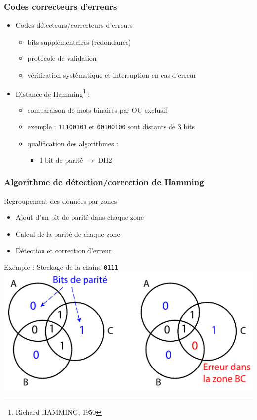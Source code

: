 \begin{frame}
\frametitle{Codes correcteurs d'erreurs}
\begin{itemize}
\item <1> Codes détecteurs/correcteurs d'erreurs
\begin{itemize}
\item bits supplémentaires (redondance)
\item protocole de validation
\item vérification systèmatique et interruption en cas d'erreur
\end{itemize}
\item <2> Distance de Hamming\footnote{Richard HAMMING, 1950} :
\begin{itemize}
\item comparaison de mots binaires par OU exclusif
\item exemple : \texttt{11100101} et \texttt{00100100} sont distants de 3 bits
\item qualification des algorithmes :
\begin{itemize}
\item 1 bit de parité $\rightarrow$ DH2
\end{itemize}
\end{itemize}
\end{itemize}
\end{frame}

\begin{frame}
\frametitle{Algorithme de détection/correction de Hamming}
Regroupement des données par zones
\begin{itemize}
\item Ajout d'un bit de parité dans chaque zone
\item Calcul de la parité de chaque zone
\item Détection et correction d'erreur
\end{itemize}
\begin{exampleblock}{Exemple : Stockage de la chaîne \texttt{0111}}
\includegraphics{../illustration/hamming.pdf}
\end{exampleblock}
\end{frame}

